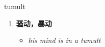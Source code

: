 
\begin{frame}
{\huge tumult}
\begin{center}
\begin{enumerate}\Large
  \item \textbf{骚动，暴动}
  \begin{itemize}
    \item \em{\Large{his mind is in a tumult}}
  \end{itemize}
\end{enumerate}
\end{center}
\end{frame}
